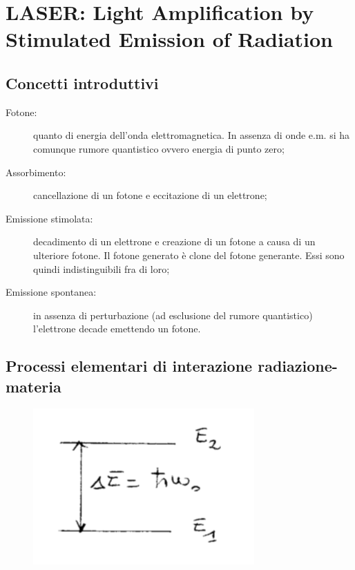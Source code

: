 \chapter{LASER: Light Amplification by Stimulated Emission of Radiation}
\graphicspath{{./cap_1/images/}}

\section*{Concetti introduttivi}

\begin{description}
    \item [Fotone:]  quanto di energia dell'onda elettromagnetica. In assenza di onde e.m. si ha comunque rumore quantistico ovvero energia di punto zero;
    \item [Assorbimento:] cancellazione di un fotone e eccitazione di un elettrone;
    \item [Emissione stimolata:] decadimento di un elettrone e creazione di un fotone a causa di un ulteriore fotone. Il fotone generato è clone del fotone generante. Essi sono quindi indistinguibili fra di loro;
    \item [Emissione spontanea:] in assenza di perturbazione (ad esclusione del rumore quantistico) l'elettrone decade emettendo un fotone.
\end{description}

\section{Processi elementari di interazione radiazione-materia}

\begin{figure}
    \centering
    \includegraphics[width=0.9\linewidth]{jump}
\end{figure}

